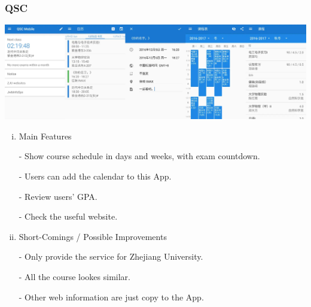 \documentclass{article}
\begin{document}
    \subsubsection{QSC}
    \begin{center}
        \includegraphics[width=6.9in]{QSC}
    \end{center}
    \begin{enumerate}[i)]

    \item Main Features

    - Show course schedule in days and weeks, with exam countdown.

    - Users can add the calendar to this App.

    - Review users' GPA.

    - Check the useful website.

    \item Short-Comings / Possible Improvements
    
    - Only provide the service for Zhejiang University.
    
    - All the course lookes similar.

    - Other web information are just copy to the App.

    \end{enumerate}
    
\end{document}
